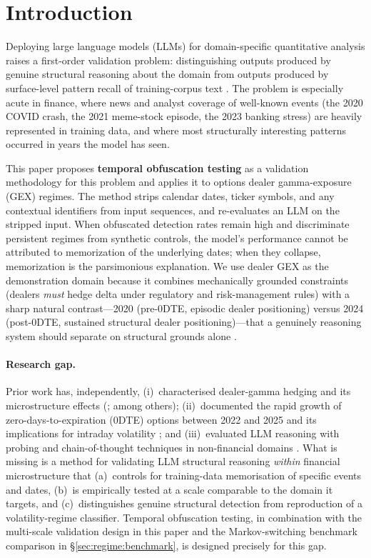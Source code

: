 \section{Introduction}
\label{sec:introduction}

Deploying large language models (LLMs) for domain-specific quantitative analysis raises a first-order validation problem: distinguishing outputs produced by genuine structural reasoning about the domain from outputs produced by surface-level pattern recall of training-corpus text \citep{mccoy2023embers}. The problem is especially acute in finance, where news and analyst coverage of well-known events (the 2020 COVID crash, the 2021 meme-stock episode, the 2023 banking stress) are heavily represented in training data, and where most structurally interesting patterns occurred in years the model has seen.

This paper proposes \textbf{temporal obfuscation testing} as a validation methodology for this problem and applies it to options dealer gamma-exposure (GEX) regimes. The method strips calendar dates, ticker symbols, and any contextual identifiers from input sequences, and re-evaluates an LLM on the stripped input. When obfuscated detection rates remain high and discriminate persistent regimes from synthetic controls, the model's performance cannot be attributed to memorization of the underlying dates; when they collapse, memorization is the parsimonious explanation. We use dealer GEX as the demonstration domain because it combines mechanically grounded constraints (dealers \emph{must} hedge delta under regulatory and risk-management rules) with a sharp natural contrast---2020 (pre-0DTE, episodic dealer positioning) versus 2024 (post-0DTE, sustained structural dealer positioning)---that a genuinely reasoning system should separate on structural grounds alone \citep{ni2005stock,garleanu2009demand,dim2023odtes}.

\paragraph{Research gap.}
Prior work has, independently, (i)~characterised dealer-gamma hedging and its microstructure effects (\citealp{ni2005stock,garleanu2009demand,anderegg2022impact,dim2023odtes,adams2025zerodte}; among others); (ii)~documented the rapid growth of zero-days-to-expiration (0DTE) options between 2022 and 2025 and its implications for intraday volatility \citep{cboe2024zero,fishman2023gamma,cboe2025spx0dte}; and (iii)~evaluated LLM reasoning with probing and chain-of-thought techniques in non-financial domains \citep{wei2022chain,kojima2022large,mccoy2023embers}. What is missing is a method for validating LLM structural reasoning \emph{within} financial microstructure that (a)~controls for training-data memorisation of specific events and dates, (b)~is empirically tested at a scale comparable to the domain it targets, and (c)~distinguishes genuine structural detection from reproduction of a volatility-regime classifier. Temporal obfuscation testing, in combination with the multi-scale validation design in this paper and the Markov-switching benchmark comparison in \S\ref{sec:regime:benchmark}, is designed precisely for this gap.

